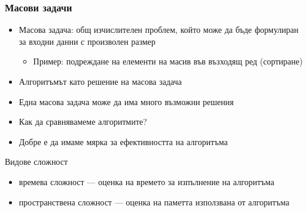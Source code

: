 \documentclass{beamer}
\begin{document}
\begin{frame}
  \frametitle{Масови задачи}

  \begin{itemize}[<+->]
  \item Масова задача: общ изчислителен проблем, който може да бъде формулиран за входни данни с произволен размер
    \begin{itemize}
    \item Пример: подреждане на елементи на масив във възходящ ред (сортиране)
    \end{itemize}
  \item Алгоритъмът като решение на масова задача
  \item Една масова задача може да има много възможни решения
  \item \alert{Как да сравнявамеме алгоритмите?}
  \item Добре е да имаме мярка за ефективността на алгоритъма
  \end{itemize}

  \pause
  \vspace{1em}
  Видове сложност
  \begin{itemize}
  \item времева сложност --- оценка на времето за изпълнение на алгоритъма
  \item пространствена сложност --- оценка на паметта използвана от алгоритъма
  \end{itemize}

\end{frame}
\end{document}
